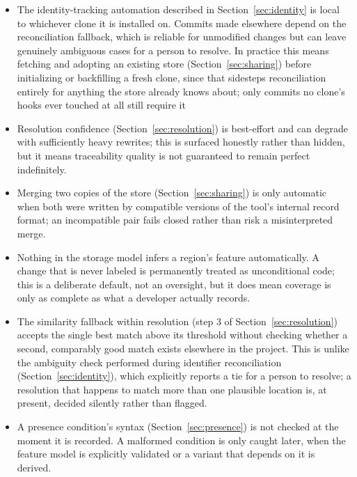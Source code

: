 \documentclass[11pt]{article}
\begin{document}
\begin{itemize}[leftmargin=1.4em]
  \item The identity-tracking automation described in
    Section~\ref{sec:identity} is local to whichever clone it is
    installed on. Commits made elsewhere depend on the reconciliation
    fallback, which is reliable for unmodified changes but can leave
    genuinely ambiguous cases for a person to resolve.
    In practice this means fetching and adopting an existing store (Section~\ref{sec:sharing}) before initializing or backfilling a fresh clone, since that sidesteps reconciliation entirely for anything the store already knows about; only commits no clone's hooks ever touched at all still require it
  \item Resolution confidence (Section~\ref{sec:resolution}) is
    best-effort and can degrade with sufficiently heavy rewrites; this is
    surfaced honestly rather than hidden, but it means traceability
    quality is not guaranteed to remain perfect indefinitely.
  \item Merging two copies of the store (Section~\ref{sec:sharing}) is
    only automatic when both were written by compatible versions of the
    tool's internal record format; an incompatible pair fails closed
    rather than risk a misinterpreted merge.
  \item Nothing in the storage model infers a region's feature
    automatically. A change that is never labeled is permanently treated
    as unconditional code; this is a deliberate default, not an
    oversight, but it does mean coverage is only as complete as what a
    developer actually records.
  \item The similarity fallback within resolution (step 3 of
    Section~\ref{sec:resolution}) accepts the single best match above its
    threshold without checking whether a second, comparably good match
    exists elsewhere in the project. This is unlike the ambiguity check
    performed during identifier reconciliation (Section~\ref{sec:identity}),
    which explicitly reports a tie for a person to resolve; a resolution
    that happens to match more than one plausible location is, at
    present, decided silently rather than flagged.
  \item A presence condition's syntax (Section~\ref{sec:presence}) is not
    checked at the moment it is recorded. A malformed condition is only
    caught later, when the feature model is explicitly validated or a
    variant that depends on it is derived.
\end{itemize}
\end{document}
